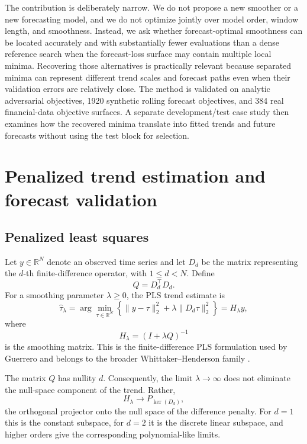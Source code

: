 \documentclass[english]{smcca}
\newcommand{\R}{\mathbb{R}}
\begin{document}
The contribution is deliberately narrow. We do not propose a new smoother or a new forecasting model, and we do not optimize jointly over model order, window length, and smoothness. Instead, we ask whether forecast-optimal smoothness can be located accurately and with substantially fewer evaluations than a dense reference search when the forecast-loss surface may contain multiple local minima. Recovering those alternatives is practically relevant because separated minima can represent different trend scales and forecast paths even when their validation errors are relatively close. The method is validated on analytic adversarial objectives, 1920 synthetic rolling forecast objectives, and 384 real financial-data objective surfaces. A separate development/test case study then examines how the recovered minima translate into fitted trends and future forecasts without using the test block for selection.

\section{Penalized trend estimation and forecast validation}

\subsection{Penalized least squares}

Let \(y\in\R^N\) denote an observed time series and let \(D_d\) be the matrix representing the \(d\)-th finite-difference operator, with \(1\le d<N\). Define
\[
Q=D_d^\top D_d.
\]
For a smoothing parameter \(\lambda\ge0\), the PLS trend estimate is
\begin{equation}
\widehat{\tau}_\lambda
=
\arg\min_{\tau\in\R^N}
\left\{
\|y-\tau\|_2^2
+
\lambda\|D_d\tau\|_2^2
\right\}
=
H_\lambda y,
\label{eq:pls}
\end{equation}
where
\begin{equation}
H_\lambda=(I+\lambda Q)^{-1}
\label{eq:smoother}
\end{equation}
is the smoothing matrix. This is the finite-difference PLS formulation used by Guerrero \cite{guerrero2007penalized} and belongs to the broader Whittaker--Henderson family \cite{whittaker1923graduation,weinert2007wh}.

The matrix \(Q\) has nullity \(d\). Consequently, the limit \(\lambda\to\infty\) does not eliminate the null-space component of the trend. Rather,
\[
H_\lambda
\longrightarrow
P_{\ker(D_d)},
\]
the orthogonal projector onto the null space of the difference penalty. For \(d=1\) this is the constant subspace, for \(d=2\) it is the discrete linear subspace, and higher orders give the corresponding polynomial-like limits.
\end{document}
